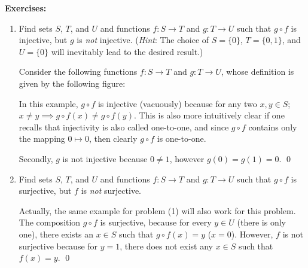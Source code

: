 \documentclass[letterpaper]{article}
\begin{document}
\noindent \textbf{Exercises:}
\begin{enumerate}
\item Find sets $S$, $T$, and $U$ and functions $f:S \to T$ and $g: T \to U$ such that $g \circ f$ is injective, but $g$ is \emph{not} injective. (\emph{Hint}: The choice of $S=\{0\}$, $T=\{0,1\}$, and $U=\{0\}$ will inevitably lead to the desired result.)
\begin{example*}
Consider the following functions $f:S \to T$ and $g: T \to U$, whose definition is given by the following figure:
\begin{center}
\end{center}
\end{example*}
In this example, $g \circ f$ is injective (vacuously) because for any two $x,y \in S$; $x \neq y \implies g \circ f(x) \neq g \circ f(y)$. This is also more intuitively clear if one recalls that injectivity is also called one-to-one, and since $g \circ f$ contains only the mapping $0 \mapsto 0$, then clearly $g \circ f$ is one-to-one. 

Secondly, $g$ is not injective because $0 \neq 1$, however $g(0)=g(1)=0$. \qed

\item Find sets $S$, $T$, and $U$ and functions $f:S \to T$ and $g: T \to U$ such that $g \circ f$ is surjective, but $f$ is \emph{not} surjective.
\begin{example*}
Actually, the same example for problem (1) will also work for this problem. The composition $g \circ f$ is surjective, because for every $y \in U$ (there is only one), there exists an $x \in S$ such that $g \circ f(x)=y$ ($x=0$). However, $f$ is not surjective because for $y=1$, there does not exist any $x \in S$ such that $f(x)=y$. \qed
\end{example*}


\end{enumerate}
\end{document}
